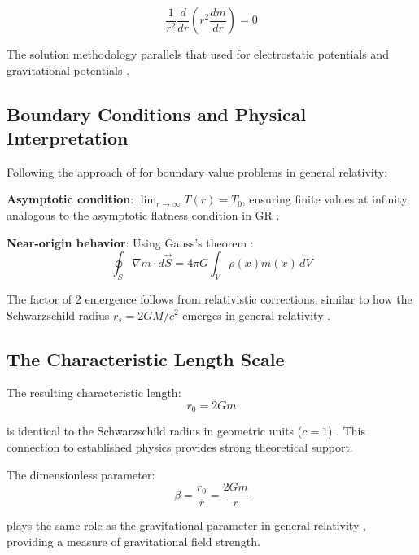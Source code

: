 \documentclass[12pt,a4paper]{article}
\begin{document}
\begin{equation}
	\frac{1}{r^2}\frac{d}{dr}\left(r^2 \frac{dm}{dr}\right) = 0
\end{equation}

The solution methodology parallels that used for electrostatic potentials \citep{griffiths1999} and gravitational potentials \citep{binney2008}.

	\subsection{Boundary Conditions and Physical Interpretation}
	\label{subsec:boundary_conditions}
	
	Following the approach of \citet{misner1973} for boundary value problems in general relativity:
	
	\textbf{Asymptotic condition}: $\lim_{r \to \infty} T(r) = T_0$, ensuring finite values at infinity, analogous to the asymptotic flatness condition in GR \citep{carroll2004}.
	
	\textbf{Near-origin behavior}: Using Gauss's theorem \citep{griffiths1999,jackson1998}:
	\begin{equation}
		\oint_S \nabla m \cdot d\vec{S} = 4\pi G \int_V \rho(x) m(x) \, dV
	\end{equation}
	
	The factor of 2 emergence follows from relativistic corrections, similar to how the Schwarzschild radius $r_s = 2GM/c^2$ emerges in general relativity \citep{schwarzschild1916,misner1973}.
	
	\subsection{The Characteristic Length Scale}
	\label{subsec:characteristic_length}
	
	The resulting characteristic length:
	\begin{equation}
		\boxed{r_0 = 2Gm}
	\end{equation}
	
	is identical to the Schwarzschild radius in geometric units ($c = 1$) \citep{misner1973,carroll2004}. This connection to established physics provides strong theoretical support.
	
	The dimensionless parameter:
	\begin{equation}
		\boxed{\beta = \frac{r_0}{r} = \frac{2Gm}{r}}
	\end{equation}
	
	plays the same role as the gravitational parameter in general relativity \citep{weinberg1972}, providing a measure of gravitational field strength.
	
\end{document}
